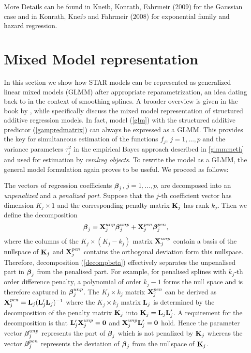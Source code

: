 \documentclass[11pt,a4paper,twoside]{bayesxarticle}
\begin{document}
More Details can be found in Kneib, Konrath, Fahrmeir (2009) for the Gaussian case
and in Konrath, Kneib and Fahrmeir (2008) for exponential family and hazard regression.


\section{Mixed Model representation}
\label{glmmrep}

In this section we show how STAR models can be represented as generalized linear mixed models (GLMM) after appropriate
reparametrization, an idea dating back to  in the context of smoothing splines. A broader overview is given
in the book by , while  specifically discuss the mixed model representation of
structured additive regression models. In fact, model (\ref{glm}) with the structured additive predictor (\ref{gampredmatrix})
can always be expressed as a GLMM. This provides the key for simultaneous estimation of the functions $f_j$, $j=1,\dots,p$ and
the variance parameters $\tau^2_j$ in the empirical Bayes approach described in \autoref{glmmmeth} and used for estimation by
{\em remlreg objects}. To rewrite the model as a GLMM, the general model formulation again proves to be useful. We proceed as
follows:

The  vectors of regression coefficients $\boldsymbol{\beta}_j$, $j=1,\dots,p$,
are decomposed into an {\em unpenalized} and a {\em penalized part}.
Suppose that the $j$-th coefficient vector has dimension $K_j \times
1$ and the corresponding penalty matrix $\mathbf{K}_j$ has rank $k_j$. Then
we define the decomposition
\begin{equation}\label{decompbeta}
 \betavec_j = \Xvec_j^{unp} \betavec_j^{unp} + \Xvec_j^{pen}\betavec_j^{pen},
\end{equation}
where the columns of the $K_j \times (K_j - k_j)$ matrix
$\mathbf{X}_j^{unp}$ contain a basis of the nullspace of $\mathbf{K}_j$ and
$\mathbf{X}_j^{pen}$ contains the orthogonal deviation form this
nullspace. Therefore, decomposition (\ref{decompbeta}) effectively
separates the unpenalised part in $\boldsymbol{\beta}_j$ from the penalised
part. For example, for penalised splines with $k_j$-th order
difference penalty, a polynomial of order $k_j-1$ forms the null
space and is therefore captured in $\boldsymbol{\beta}_j^{unp}$. The  $K_j
\times k_j$ matrix $\mathbf{X}_j^{pen}$ can be derived as $\mathbf{X}_j^{pen}
= \mathbf{L}_j(\mathbf{L}_j'\mathbf{L}_j)^{-1}$ where the $K_j \times k_j$ matrix
$\mathbf{L}_j$ is determined by the decomposition of the penalty matrix
$\mathbf{K}_j$ into $\mathbf{K}_j = \mathbf{L}_j \mathbf{L}_j'$. A requirement for the
decomposition is that $\mathbf{L}_j' \mathbf{X}_j^{unp} = \boldsymbol{0}$ and
$\mathbf{X}_j^{unp} \mathbf{L}_j' = \boldsymbol{0}$ hold. Hence the parameter vector
$\boldsymbol{\beta}_j^{unp}$ represents the part of $\boldsymbol{\beta}_j$ which is not
penalized by $\mathbf{K}_j$ whereas the vector $\boldsymbol{\beta}_j^{pen}$
represents the deviation of $\boldsymbol{\beta}_j$ from the nullspace of
$\mathbf{K}_j$.
\end{document}
